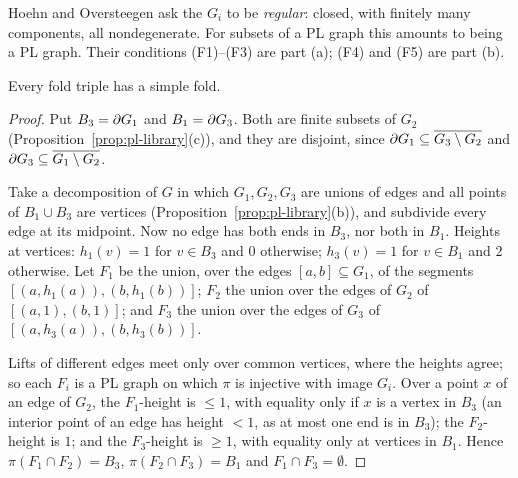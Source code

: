 
Hoehn and Oversteegen ask the $G_i$ to be \emph{regular}: closed, with finitely many components, all nondegenerate. For subsets of a PL graph this amounts
to being a PL graph. Their conditions (F1)--(F3) are part (a); (F4) and (F5) are part (b).

\begin{theorem}\label{thm:fold-exists}
Every fold triple has a simple fold.
\end{theorem}

\begin{proof}
Put $B_3=\partial G_1$ and $B_1=\partial G_3$. Both are finite subsets of $G_2$ (Proposition~\ref{prop:pl-library}(c)), and they are disjoint, since
$\partial G_1\subseteq\overline{G_3\setminus G_2}$ and $\partial G_3\subseteq\overline{G_1\setminus G_2}$.

Take a decomposition of $G$ in which $G_1,G_2,G_3$ are unions of edges and all points of $B_1\cup B_3$ are vertices
(Proposition~\ref{prop:pl-library}(b)), and subdivide every edge at its midpoint. Now no edge has both ends in $B_3$, nor both in $B_1$. Heights at vertices:
$h_1(v)=1$ for $v\in B_3$ and $0$ otherwise; $h_3(v)=1$ for $v\in B_1$ and $2$ otherwise. Let $F_1$ be the union, over the edges $[a,b]\subseteq G_1$, of the
segments $[(a,h_1(a)),(b,h_1(b))]$; $F_2$ the union over the edges of $G_2$ of $[(a,1),(b,1)]$; and $F_3$ the union over the edges of $G_3$ of
$[(a,h_3(a)),(b,h_3(b))]$.

Lifts of different edges meet only over common vertices, where the heights agree; so each $F_i$ is a PL graph on which $\pi$ is injective with image $G_i$.
Over a point $x$ of an edge of $G_2$, the $F_1$-height is $\le1$, with equality only if $x$ is a vertex in $B_3$ (an interior point of an edge has height $<1$,
as at most one end is in $B_3$); the $F_2$-height is $1$; and the $F_3$-height is $\ge1$, with equality only at vertices in $B_1$. Hence $\pi(F_1\cap F_2)=B_3$,
$\pi(F_2\cap F_3)=B_1$ and $F_1\cap F_3=\emptyset$.
\end{proof}


